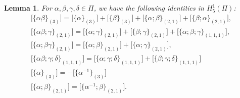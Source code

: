 \documentclass[pdftex]{sigma}
\numberwithin{equation}{section}
\newtheorem{Lemma}[Theorem]{Lemma}
\begin{document}
\begin{Lemma}
 For $\alpha, \beta, \gamma,\delta \in \Pi$, we have the following identities in $H_{5}^1(\Pi)$:
 \begin{gather*}
 \big[\{\alpha\beta\}_{(3)} \big]=\big[\{\alpha\}_{(3)}\big]+\big[\{\beta\}_{(3)}\big]+\big[\{\alpha;\beta\}_{(2,1)}\big]+\big[\{\beta;\alpha\}_{(2,1)}\big],\\
 \big[\{\alpha\beta;\gamma\}_{(2,1)}\big]=\big[\{\alpha;\gamma\}_{(2,1)}\big]+\big[\{\beta;\gamma\}_{(2,1)}\big]+\big[\{\alpha;\beta;\gamma\}_{(1,1,1)} \big],\\
 \big[\{\alpha;\beta\gamma\}_{(2,1)}\big]=\big[\{\alpha;\beta\}_{(2,1)}\big]+\big[\{\alpha;\gamma\}_{(2,1)}\big], \\
 \big[\{\alpha\beta;\gamma;\delta\}_{(1,1,1)}\big]= \big[\{\alpha;\gamma;\delta\}_{(1,1,1)}\big]+\big[\{\beta;\gamma;\delta\}_{(1,1,1)}\big]\\
 \big[\{\alpha\}_{(3)}\big]=-\big[\big\{\alpha^{-1}\big\}_{(3)}\big]\\
 \big[\{\alpha;\beta\}_{(2,1)}\big]=\big[\big\{\alpha^{-1};\beta\big\}_{(2,1)}\big].
 \end{gather*}
\end{Lemma}
\end{document}
